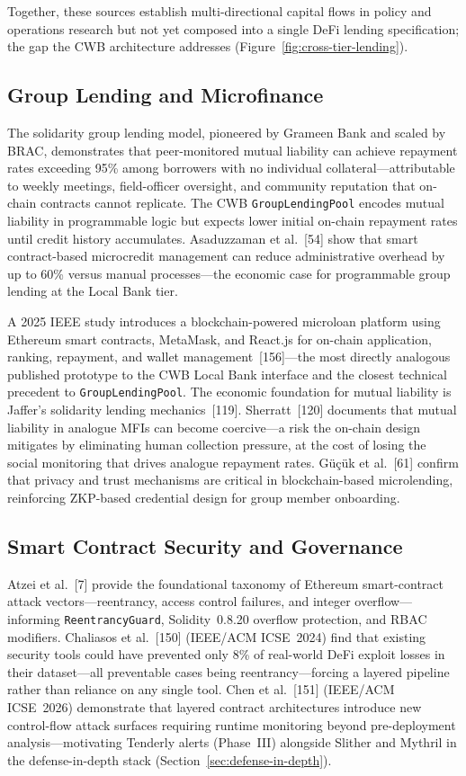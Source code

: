 \documentclass[12pt,a4paper]{report}
\begin{document}
Together, these sources establish multi-directional capital flows in policy and operations research but not yet composed into a single DeFi lending specification; the gap the CWB architecture addresses (Figure~\ref{fig:cross-tier-lending}).

\subsection{Group Lending and Microfinance}

The solidarity group lending model, pioneered by Grameen Bank and scaled by BRAC, demonstrates that peer-monitored mutual liability can achieve repayment rates exceeding 95\% among borrowers with no individual collateral---attributable to weekly meetings, field-officer oversight, and community reputation that on-chain contracts cannot replicate. The CWB \texttt{GroupLendingPool} encodes mutual liability in programmable logic but expects lower initial on-chain repayment rates until credit history accumulates. Asaduzzaman et al.~[54] show that smart contract-based microcredit management can reduce administrative overhead by up to 60\% versus manual processes---the economic case for programmable group lending at the Local Bank tier.

A 2025 IEEE study introduces a blockchain-powered microloan platform using Ethereum smart contracts, MetaMask, and React.js for on-chain application, ranking, repayment, and wallet management~[156]---the most directly analogous published prototype to the CWB Local Bank interface and the closest technical precedent to \texttt{GroupLendingPool}. The economic foundation for mutual liability is Jaffer's solidarity lending mechanics~[119]. Sherratt~[120] documents that mutual liability in analogue MFIs can become coercive---a risk the on-chain design mitigates by eliminating human collection pressure, at the cost of losing the social monitoring that drives analogue repayment rates. G\"{u}\c{c}\"uk et al.~[61] confirm that privacy and trust mechanisms are critical in blockchain-based microlending, reinforcing ZKP-based credential design for group member onboarding.

\subsection{Smart Contract Security and Governance}

Atzei et al.~[7] provide the foundational taxonomy of Ethereum smart-contract attack vectors---reentrancy, access control failures, and integer overflow---informing \texttt{ReentrancyGuard}, Solidity~0.8.20 overflow protection, and RBAC modifiers. Chaliasos et al.~[150] (IEEE/ACM ICSE~2024) find that existing security tools could have prevented only 8\% of real-world DeFi exploit losses in their dataset---all preventable cases being reentrancy---forcing a layered pipeline rather than reliance on any single tool. Chen et al.~[151] (IEEE/ACM ICSE~2026) demonstrate that layered contract architectures introduce new control-flow attack surfaces requiring runtime monitoring beyond pre-deployment analysis---motivating Tenderly alerts (Phase~III) alongside Slither and Mythril in the defense-in-depth stack (Section~\ref{sec:defense-in-depth}).
\end{document}
